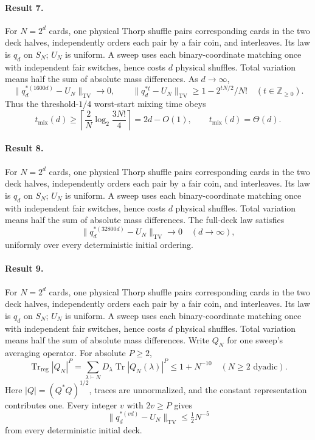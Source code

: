 \documentclass[11pt]{article}
\begin{document}
\paragraph{Result 7.} For $N=2^d$ cards, one physical Thorp shuffle pairs corresponding cards in the two deck halves, independently orders each pair by a fair coin, and interleaves. Its law is $q_d$ on $S_N$; $U_N$ is uniform. A sweep uses each binary-coordinate matching once with independent fair switches, hence costs $d$ physical shuffles. Total variation means half the sum of absolute mass differences. As $d\to\infty$,
\[
 \|q_d^{*(1600d)}-U_N\|_{\mathrm{TV}}\to0,
 \qquad \|q_d^{*t}-U_N\|_{\mathrm{TV}}\ge1-2^{tN/2}/N!\quad(t\in\mathbb Z_{\ge0}).
\]
Thus the threshold-$1/4$ worst-start mixing time obeys
\[
 t_{\mathrm{mix}}(d)\ge\left\lceil\frac2N\log_2\frac{3N!}{4}\right\rceil=2d-O(1),
 \qquad t_{\mathrm{mix}}(d)=\Theta(d).
\]

\paragraph{Result 8.} For $N=2^d$ cards, one physical Thorp shuffle pairs corresponding cards in the two deck halves, independently orders each pair by a fair coin, and interleaves. Its law is $q_d$ on $S_N$; $U_N$ is uniform. A sweep uses each binary-coordinate matching once with independent fair switches, hence costs $d$ physical shuffles. Total variation means half the sum of absolute mass differences. The full-deck law satisfies
\[
 \|q_d^{*(32800d)}-U_N\|_{\mathrm{TV}}\longrightarrow0\quad(d\to\infty),
\]
uniformly over every deterministic initial ordering.

\paragraph{Result 9.} For $N=2^d$ cards, one physical Thorp shuffle pairs corresponding cards in the two deck halves, independently orders each pair by a fair coin, and interleaves. Its law is $q_d$ on $S_N$; $U_N$ is uniform. A sweep uses each binary-coordinate matching once with independent fair switches, hence costs $d$ physical shuffles. Total variation means half the sum of absolute mass differences. Write $Q_N$ for one sweep's averaging operator. For absolute $P\ge2$,
\[
 \operatorname{Tr}_{\mathrm{reg}}|Q_N|^P
 =\sum_{\lambda\vdash N}D_\lambda\operatorname{Tr}|Q_N(\lambda)|^P
 \le1+N^{-10}\quad(N\ge2\text{ dyadic}).
\]
Here $|Q|=(Q^*Q)^{1/2}$, traces are unnormalized, and the constant representation contributes one. Every integer $v$ with $2v\ge P$ gives
\[
 \|q_d^{*(vd)}-U_N\|_{\mathrm{TV}}\le\tfrac12N^{-5}
\]
from every deterministic initial deck.
\end{document}
